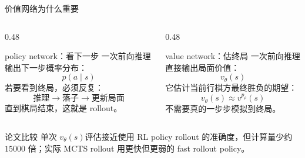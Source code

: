 \documentclass[UTF8,aspectratio=169,10pt]{ctexbeamer}
\newcommand{\valuefn}{$v_{\theta}(s)$}
\begin{document}
\begin{frame}{价值网络为什么重要}
  \small
  \begin{columns}[T,onlytextwidth]
    \begin{column}{0.48\textwidth}
      \begin{block}{policy network：看下一步}
        一次前向推理输出下一步概率分布：
        \[
          p(a\mid s)
        \]
        若要看到终局，必须反复：
        \[
          \text{推理} \rightarrow \text{落子} \rightarrow \text{更新局面}
        \]
        直到棋局结束，这就是 rollout。
      \end{block}
    \end{column}
    \begin{column}{0.48\textwidth}
      \begin{block}{value network：估终局}
        一次前向推理直接输出局面价值：
        \[
          v_{\theta}(s)
        \]
        它估计当前行棋方最终胜负的期望：
        \[
          v_{\theta}(s) \approx v^{p_{\rho}}(s)
        \]
        不需要真的一步步模拟到终局。
      \end{block}
    \end{column}
  \end{columns}

  \vspace{0.08cm}
  \begin{alertblock}{论文比较}
    单次 \valuefn 评估接近使用 RL policy rollout 的准确度，但计算量少约 $15000$ 倍；实际 MCTS rollout 用更快但更弱的 fast rollout policy。
  \end{alertblock}
\end{frame}
\end{document}
